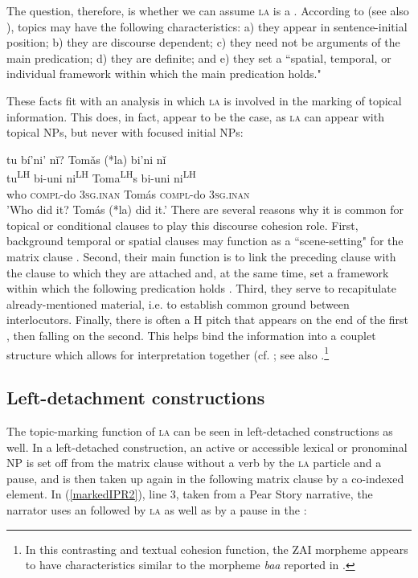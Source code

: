 The question, therefore, is whether we can assume \textsc{la} is a . According to \citet[50]{chafe1976} (see also \citealt{li1976}), topics may have the following characteristics: a) they appear in sentence-initial position; b) they are discourse dependent; c) they need not be arguments of the main predication; d) they are definite; and e) they set a ``spatial, temporal, or individual framework within which the main predication holds." 

These facts fit with an analysis in which \textsc{la} is involved in the marking of topical information. This does, in fact, appear to be the case, as \textsc{la} can appear with topical NPs, but never with focused initial NPs:

\ea
{}tu b\'{i}'ni' n\v{i}? Tom\v{a}s (*la) bi'ni n\v{i} \\
tu\textsuperscript{LH} bi-uni ni\textsuperscript{LH} Toma\textsuperscript{LH}s { } bi-uni ni\textsuperscript{LH}  \\
who \textsc{compl}-do 3\textsc{sg.inan} Tom\'{a}s { } \textsc{compl}-do 3\textsc{sg.inan}  \\
\glt 'Who did it? Tom\'{a}s (*la) did it.'
\z
There are several reasons why it is common for topical  or conditional clauses to play this discourse cohesion role. First, background temporal or spatial clauses may function as a ``scene-setting"  for the matrix clause \citep[125]{lambrecht1994}. Second, their main function is to link the preceding clause with the clause to which they are attached and, at the same time, set a framework within which the following predication holds \citep[294]{thompson2007}. Third, they serve to recapitulate already-mentioned material, i.e. to establish common ground between interlocutors. Finally, there is often a H pitch that appears on the end of the first , then falling on the second. This helps bind the information into a couplet structure which allows for interpretation together (cf. ; see also \citet[126-7]{sicoli2007}.\footnote{In this contrasting and textual cohesion function, the ZAI morpheme appears to have characteristics similar to the  morpheme  \textit{baa} reported in \citet[138-140]{matic2013}.}


\subsection{Left-detachment constructions}

The topic-marking function of \textsc{la} can be seen in left-detached constructions as well. In a left-detached construction, an active or accessible lexical or pronominal NP is set off from the matrix clause without a verb by the \textsc{la} particle and a pause, and is then taken up again in the following matrix clause by a co-indexed element. In (\ref{markedIPR2}), line 3, taken from a Pear Story narrative, the narrator uses an  followed by \textsc{la} as well as by a pause in the : 

